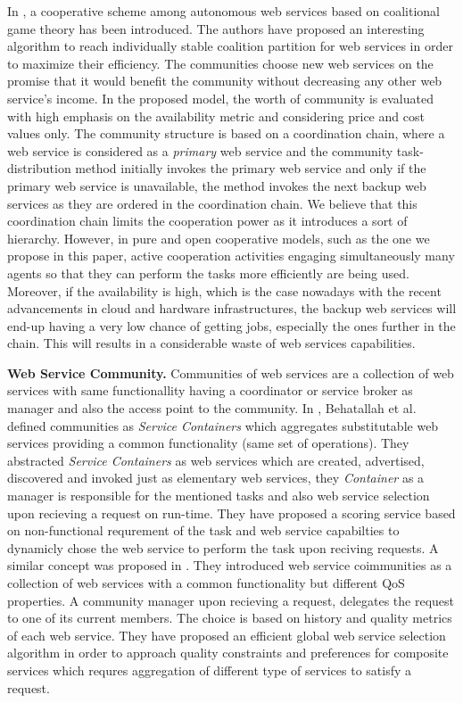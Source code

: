 \documentclass[10pt,journal,cspaper,compsoc]{IEEEtran}
\begin{document}
In \cite{10.1109/TSC.2012.12}, a cooperative scheme among
autonomous web services based on coalitional game theory has been
introduced. The authors have proposed an interesting algorithm to
reach individually stable coalition partition for web services in
order to maximize their efficiency. The communities choose new web
services on the promise that it would benefit the community
without decreasing any other web service's income. In the proposed
model, the worth of community is evaluated with high emphasis on
the availability metric and considering price and cost values
only. The community structure is based on a coordination chain,
where a web service is considered as a \emph{primary} web service
and the community task-distribution method initially invokes the
primary web service and only if the primary web service is
unavailable, the method invokes the next backup web services as
they are ordered in the coordination chain. We believe that this
coordination chain limits the cooperation power as it introduces a
sort of hierarchy. However, in pure and open cooperative models,
such as the one we propose in this paper, active cooperation
activities engaging simultaneously many agents so that they can
perform the tasks more efficiently are being used. Moreover, if
the availability is high, which is the case nowadays with the
recent advancements in cloud and hardware infrastructures, the
backup web services will end-up having a very low chance of
getting jobs, especially the ones further in the chain. This will
results in a considerable waste of web services capabilities.

\textbf{Web Service Community.}
Communities of web services are a collection of web services with same functionallity having a 
coordinator or service broker as manager and also the access point to the community. In \cite{DBLP:journals/internet/BenatallahSD03}, Behatallah et al. defined communities as \emph{Service Containers} which aggregates substitutable web services providing a common functionality (same set of operations). They abstracted \emph{Service Containers} as web services which are created, advertised, discovered and invoked just as elementary web services, they \emph{Container} as a manager is responsible for the mentioned tasks and also web service selection upon recieving a request on run-time. They have proposed a scoring service based on non-functional requrement of the task and web service capabilties to dynamicly chose the web service to perform the task upon reciving requests. A similar concept was proposed in \cite{DBLP:journals/ijebr/MaamarSTBB09}. They introduced web service coimmunities as a collection of web services with a common functionality but different QoS properties. A community manager upon recieving a request, delegates the request to one of its current members. The choice is based on history and quality metrics of each web service. They have proposed an efficient global web service selection algorithm in order to approach quality constraints and preferences for composite services which requres aggregation of different type of services to satisfy a request.
\end{document}
